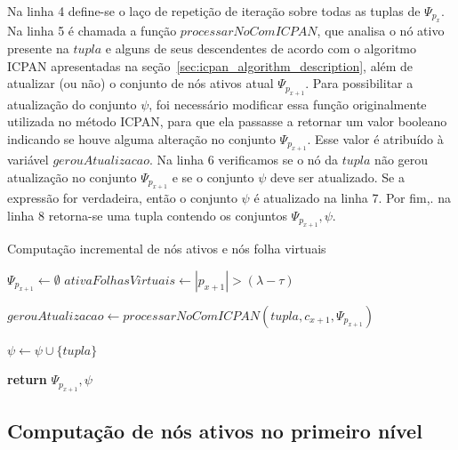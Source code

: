 Na linha 4 define-se o laço de repetição de iteração sobre todas as tuplas de $\Psi_{p_x}$. Na linha 5 é chamada a função $processarNoComICPAN$, que analisa o nó ativo presente na $tupla$ e alguns de seus descendentes de acordo com o algoritmo ICPAN apresentadas na seção~\ref{sec:icpan_algorithm_description}, além de atualizar (ou não) o conjunto de nós ativos atual $\Psi_{p_{x+1}}$. Para possibilitar a atualização do conjunto $\psi$, foi necessário modificar essa função originalmente utilizada no método ICPAN, para que ela passasse a retornar um valor booleano indicando se houve alguma alteração no conjunto $\Psi_{p_{x+1}}$. Esse valor é atribuído à variável $gerouAtualizacao$. Na linha 6 verificamos se o nó da $tupla$ não gerou atualização no conjunto $\Psi_{p_{x+1}}$ e se o conjunto $\psi$ deve ser atualizado. Se a expressão for verdadeira, então o conjunto $\psi$ é atualizado na linha 7. Por fim,. na linha 8 retorna-se uma tupla contendo os conjuntos $\Psi_{p_{x+1}}, \psi$.

\begin{algorithm}[t]
\caption{Computação incremental de nós ativos e nós folha virtuais }\label{alg:compute_active_and_virtual_leaf_nodes}
\begin{algorithmic}[1]
    \State $\Psi_{p_{x+1}} \leftarrow \emptyset$
    \State $ativaFolhasVirtuais \leftarrow |p_{x+1}| > (\lambda - \tau)$
    
        \State $gerouAtualizacao \leftarrow processarNoComICPAN(tupla, c_{x+1}, \Psi_{p_{x+1}})$
        
            \State $\psi \leftarrow \psi \cup \{tupla\}$
        \EndIf
    \EndFor
    
    \State \textbf{return} $\Psi_{p_{x+1}}, \psi$
\EndFunction
\end{algorithmic}
\end{algorithm}

\subsection{Computação de nós ativos no primeiro nível}
\label{sec:first_level_active_node_set_computation}


